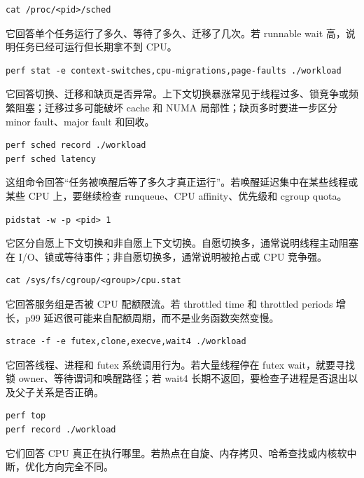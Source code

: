 \begin{lstlisting}
cat /proc/<pid>/sched
\end{lstlisting}

它回答单个任务运行了多久、等待了多久、迁移了几次。若 runnable wait 高，说明任务已经可运行但长期拿不到 CPU。

\begin{lstlisting}
perf stat -e context-switches,cpu-migrations,page-faults ./workload
\end{lstlisting}

它回答切换、迁移和缺页是否异常。上下文切换暴涨常见于线程过多、锁竞争或频繁阻塞；迁移过多可能破坏 cache 和 NUMA 局部性；缺页多时要进一步区分 minor fault、major fault 和回收。

\begin{lstlisting}
perf sched record ./workload
perf sched latency
\end{lstlisting}

这组命令回答“任务被唤醒后等了多久才真正运行”。若唤醒延迟集中在某些线程或某些 CPU 上，要继续检查 runqueue、CPU affinity、优先级和 cgroup quota。

\begin{lstlisting}
pidstat -w -p <pid> 1
\end{lstlisting}

它区分自愿上下文切换和非自愿上下文切换。自愿切换多，通常说明线程主动阻塞在 I/O、锁或等待事件；非自愿切换多，通常说明被抢占或 CPU 竞争强。

\begin{lstlisting}
cat /sys/fs/cgroup/<group>/cpu.stat
\end{lstlisting}

它回答服务组是否被 CPU 配额限流。若 throttled time 和 throttled periods 增长，p99 延迟很可能来自配额周期，而不是业务函数突然变慢。

\begin{lstlisting}
strace -f -e futex,clone,execve,wait4 ./workload
\end{lstlisting}

它回答线程、进程和 futex 系统调用行为。若大量线程停在 futex wait，就要寻找锁 owner、等待谓词和唤醒路径；若 wait4 长期不返回，要检查子进程是否退出以及父子关系是否正确。

\begin{lstlisting}
perf top
perf record ./workload
\end{lstlisting}

它们回答 CPU 真正在执行哪里。若热点在自旋、内存拷贝、哈希查找或内核软中断，优化方向完全不同。

